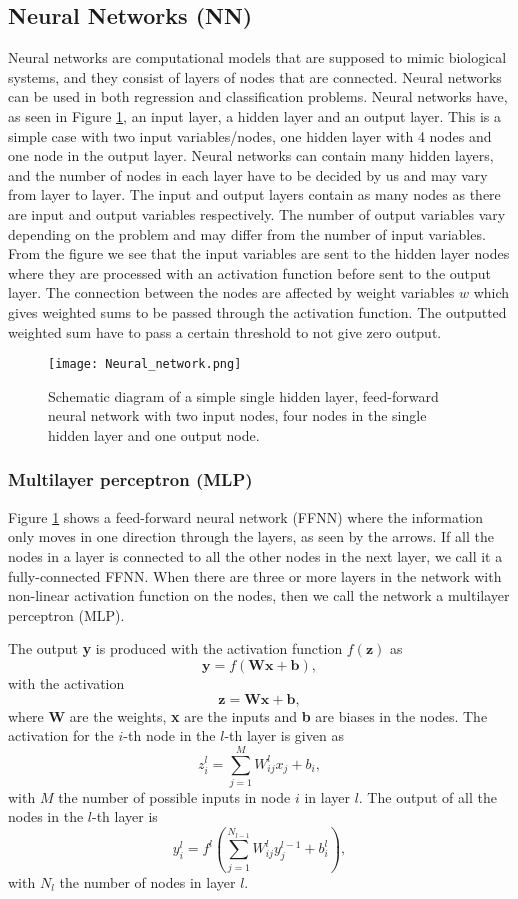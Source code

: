 \documentclass[12pt,a4paper,english]{article}
\begin{document}
\subsection{Neural Networks (NN)}
\label{sect:NN}
Neural networks are computational models that are supposed to mimic biological systems, and they consist of layers of nodes that are connected. Neural networks can be used in both regression and classification problems. Neural networks have, as seen in Figure \ref{fig:Neural_network}, an input layer, a hidden layer and an output layer. This is a simple case with two input variables/nodes, one hidden layer with 4 nodes and one node in the output layer. Neural networks can contain many hidden layers, and the number of nodes in each layer have to be decided by us and may vary from layer to layer. The input and output layers contain as many nodes as there are input and output variables respectively. The number of output variables vary depending on the problem and may differ from the number of input variables. From the figure we see that the input variables are sent to the hidden layer nodes where they are processed with an activation function before sent to the output layer. The connection between the nodes are affected by weight variables $w$ which gives weighted sums to be passed through the activation function. The outputted weighted sum have to pass a certain threshold to not give zero output.

\begin{figure}[htbp]
	\centering\texttt{[image: Neural\_network.png]}
	\caption{Schematic diagram of a simple single hidden layer, feed-forward neural network with two input nodes, four nodes in the single hidden layer and one output node.\label{fig:Neural_network}}
\end{figure} 

\subsubsection{Multilayer perceptron (MLP)}
\label{subsect:MLP}
Figure \ref{fig:Neural_network} shows a feed-forward neural network (FFNN) where the information only moves in one direction through the layers, as seen by the arrows. If all the nodes in a layer is connected to all the other nodes in the next layer, we call it a fully-connected FFNN. When there are three or more layers in the network with non-linear activation function on the nodes, then we call the network a multilayer perceptron (MLP).

The output \textbf{y} is produced with the activation function $f(\textbf{z})$ as
\[\textbf{y}=f(\textbf{Wx}+\textbf{b}),\]
with the activation 
\[\textbf{z}=\textbf{Wx}+\textbf{b},\]
where \textbf{W} are the weights, \textbf{x} are the inputs and \textbf{b} are biases in the nodes. The activation for the $i$-th node in the $l$-th layer is given as
\[z_i^l=\sum_{j=1}^{M}W^l_{ij}x_j+b_i,\]
with $M$ the number of possible inputs in node $i$ in layer $l$. The output of all the nodes in the $l$-th layer is
\[y_i^l=f^l\left(\sum_{j=1}^{N_{l-1}}W_{ij}^ly_j^{l-1}+b_i^l\right),\]
with $N_l$ the number of nodes in layer $l$.
\end{document}
